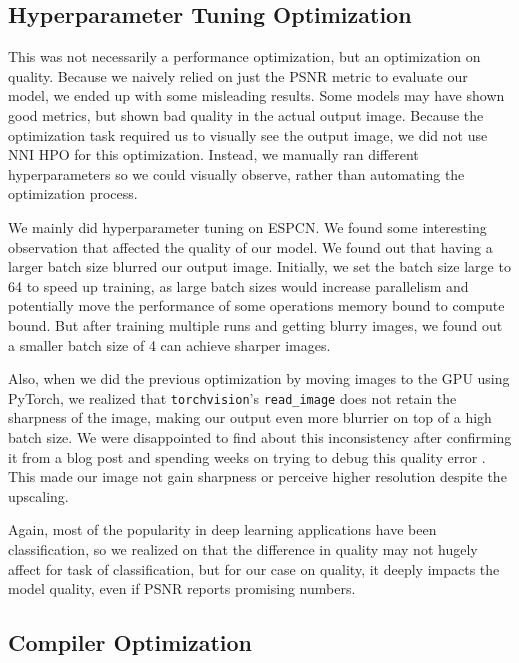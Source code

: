 \documentclass{article}
\begin{document}
\subsection{Hyperparameter Tuning Optimization}
This was not necessarily a performance optimization, but an optimization on quality. Because we naively relied on just the PSNR metric to evaluate our model, we ended up with some misleading results. Some models may have shown good metrics, but shown bad quality in the actual output image. Because the optimization task required us to visually see the output image, we did not use NNI HPO for this optimization. Instead, we manually ran different hyperparameters so we could visually observe, rather than automating the optimization process.

We mainly did hyperparameter tuning on ESPCN. We found some interesting observation that affected the quality of our model. We found out that having a larger batch size blurred our output image. Initially, we set the batch size large to 64 to speed up training, as large batch sizes would increase parallelism and potentially move the performance of some operations memory bound to compute bound. But after training multiple runs and getting blurry images, we found out a smaller batch size of 4 can achieve sharper images.

Also, when we did the previous optimization by moving images to the GPU using PyTorch, we realized that \verb|torchvision|'s \verb|read_image| does not retain the sharpness of the image, making our output even more blurrier on top of a high batch size. We were disappointed to find about this inconsistency after confirming it from a blog post and spending weeks on trying to debug this quality error \cite{torchvision-blog}. This made our image not gain sharpness or perceive higher resolution despite the upscaling.

Again, most of the popularity in deep learning applications have been classification, so we realized on that the difference in quality may not hugely affect for task of classification, but for our case on quality, it deeply impacts the model quality, even if PSNR reports promising numbers.

\subsection{Compiler Optimization}
\end{document}
